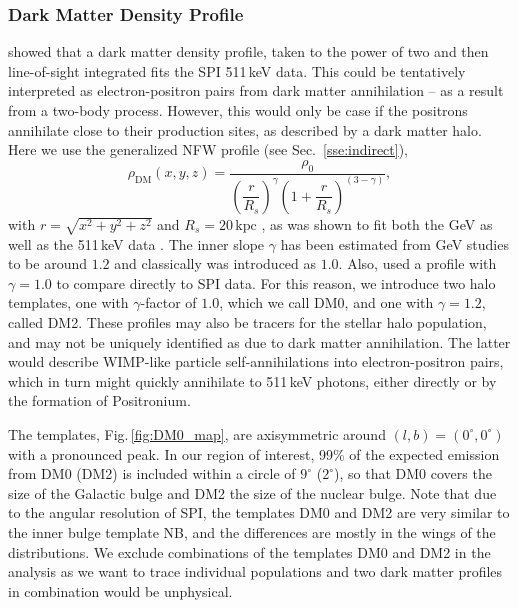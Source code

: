 \documentclass[doublespace,nopageskip]{VTthesis}
\newcommand{\mrm}[1]{\mathrm{#1}}
\begin{document}
\subsubsection{Dark Matter Density Profile}

\citet{Skinner2014_511} showed that a dark matter density profile, taken to the power of two and then line-of-sight integrated fits the SPI 511\,keV data.
%
This could be tentatively interpreted as electron-positron pairs from dark matter annihilation -- as a result from a two-body process.
%
However, this would only be case if the positrons annihilate close to their production sites, as described by a dark matter halo.
%
Here we use the generalized NFW profile (see Sec.~\ref{sse:indirect}),
\begin{equation}
  \rho_\mathrm{DM}(x, y, z) = \dfrac{\rho_0}{\left(\dfrac{r}{R_s}\right)^\gamma\left(1+\dfrac{r}{R_s}\right)^{(3-\gamma)}},
\end{equation}
\noindent with $r = \sqrt{x^2 + y^2 + z^2}$ and $R_s=20\,\mrm{kpc}$ \citep{2014PhRvD..90b3526A}, as was shown to fit both the GeV \citep{2011PhRvD..84l3005H,2014PhRvD..90b3526A,2016PDU....12....1D} as well as the 511\,keV data \citep{2012JCAP...04..022V,Skinner2014_511}.
%
The inner slope $\gamma$ has been estimated from GeV studies to be around $1.2$ and classically was introduced as $1.0$.
%
Also, \citet{Skinner2014_511} used a profile with $\gamma=1.0$ to compare directly to SPI data.
%
For this reason, we introduce two halo templates, one with $\gamma$-factor of $1.0$, which we call {DM0}, and one with $\gamma=1.2$, called {DM2}.
%
These profiles may also be tracers for the stellar halo population, and may not be uniquely identified as due to dark matter annihilation.
%
The latter would describe WIMP-like particle self-annihilations into electron-positron pairs, which in turn might quickly annihilate to 511\,keV photons, either directly or by the formation of Positronium.

The templates, Fig.\,\ref{fig:DM0_map}, are axisymmetric around $(l,b)=(0^{\circ},0^{\circ})$ with a pronounced peak.
%
In our region of interest, 99\% of the expected emission from {DM0} ({DM2}) is included within a circle of $9^{\circ}$ ($2^{\circ}$), so that {DM0} covers the size of the Galactic bulge and {DM2} the size of the nuclear bulge.
%
Note that due to the angular resolution of SPI, the templates {DM0} and {DM2} are very similar to the inner bulge template {NB}, and the differences are mostly in the wings of the distributions.
%
We exclude combinations of the templates {DM0} and {DM2} in the analysis as we want to trace individual populations and two dark matter profiles in combination would be unphysical.
\end{document}
